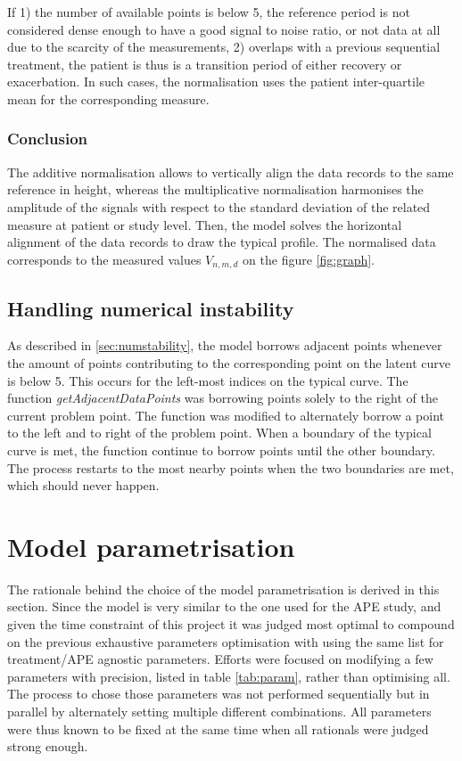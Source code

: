 If 1) the number of available points is below 5, the reference period is not considered dense enough to have a good signal to noise ratio, or not data at all due to the scarcity of the measurements, 2) overlaps with a previous sequential treatment, the patient is thus is a transition period of either recovery or exacerbation. In such cases, the normalisation uses the patient inter-quartile mean for the corresponding measure.

\subsubsection{Conclusion} 
The additive normalisation allows to vertically align the data records to the same reference in height, whereas the multiplicative normalisation harmonises the amplitude of the signals with respect to the standard deviation of the related measure at patient or study level. Then, the model solves the horizontal alignment of the data records to draw the typical profile. The normalised  data corresponds to the measured values $V_{n,m,d}$ on the figure \ref{fig:graph}.

\subsection{Handling numerical instability}
As described in \ref{sec:numstability}, the model borrows adjacent points whenever the amount of points contributing to the corresponding point on the latent curve is below 5. This occurs for the left-most indices on the typical curve. The function \textit{getAdjacentDataPoints} was borrowing points solely to the right of the current problem point. The function was modified to alternately borrow a point to the left and to right of the problem point. When a boundary of the typical curve is met, the function continue to borrow points until the other boundary. The process restarts to the most nearby points when the two boundaries are met, which should never happen.

\section{Model parametrisation} \label{sec:chosenparam}
The rationale behind the choice of the model parametrisation is derived in this section. Since the model is very similar to the one used for the APE study, and given the time constraint of this project it was judged most optimal to compound on the previous exhaustive parameters optimisation with using the same list for treatment/APE agnostic parameters. Efforts were focused on modifying a few parameters with precision, listed in table \ref{tab:param}, rather than optimising all. The process to chose those parameters was not performed sequentially but in parallel by alternately setting multiple different combinations. All parameters were thus known to be fixed at the same time when all rationals were judged strong enough.

